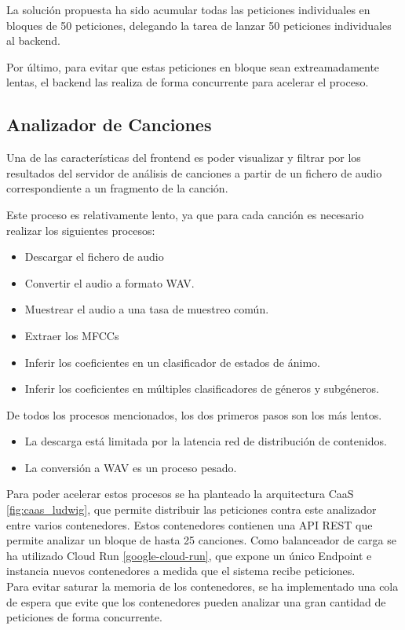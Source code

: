 La solución propuesta ha sido acumular todas las peticiones individuales
en bloques de 50 peticiones, delegando la tarea de lanzar 50 peticiones
individuales al backend.

Por último, para evitar que estas peticiones en bloque sean
extreamadamente lentas, el backend las realiza de forma concurrente para
acelerar el proceso.


\subsection{Analizador de Canciones}\label{analizador-de-canciones}

Una de las características del frontend es poder visualizar y 
filtrar por los resultados del servidor de análisis de canciones a
partir de un fichero de audio correspondiente a un fragmento de la
canción.

Este proceso es relativamente lento, ya que para cada canción es
necesario realizar los siguientes procesos:

\begin{itemize}
\itemsep0em
\item
  Descargar el fichero de audio
\item
  Convertir el audio a formato WAV.
\item
  Muestrear el audio a una tasa de muestreo común.
\item
  Extraer los MFCCs
\item
  Inferir los coeficientes en un clasificador de estados de ánimo.
\item
  Inferir los coeficientes en múltiples clasificadores de géneros y
  subgéneros.
\end{itemize}

De todos los procesos mencionados, los dos primeros pasos son los más
lentos.

\begin{itemize}
\item
  La descarga está limitada por la latencia red de distribución de
  contenidos.
\item
  La conversión a WAV es un proceso pesado.
\end{itemize}

Para poder acelerar estos procesos se ha planteado la arquitectura CaaS \ref{fig:caas_ludwig}, que permite distribuir las peticiones contra
este analizador entre varios contenedores. Estos contenedores contienen una API REST que permite analizar un bloque de hasta 25 canciones. Como balanceador de carga se ha utilizado Cloud Run \ref{google-cloud-run}, que expone un único Endpoint e instancia nuevos contenedores a medida que el sistema recibe peticiones. \\
Para evitar saturar la memoria de los contenedores, se ha implementado una cola de espera que evite que los contenedores pueden analizar una gran cantidad de peticiones de forma concurrente.

